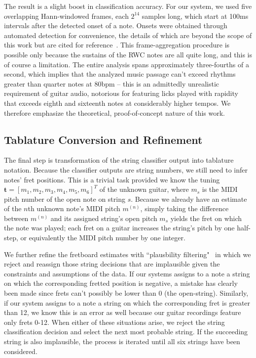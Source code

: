 \documentclass[12pt]{cmuthesis}
\begin{document}
The result is a slight boost in classification accuracy. For our system, we used five overlapping Hann-windowed frames, each $2^{14}$ samples long, which start at 100ms intervals after the detected onset of a note. Onsets were obtained through automated detection for convenience, the details of which are beyond the scope of this work but are cited for reference~\cite{bello2005,dixon2006}. This frame-aggregation procedure is possible only because the sustains of the RWC notes are all quite long, and this is of course a limitation. The entire analysis spans approximately three-fourths of a second, which implies that the analyzed music passage can't exceed rhythms greater than quarter notes at 80bpm -- this is an admittedly unrealistic requirement of guitar audio, notorious for featuring licks played with rapidity that exceeds eighth and sixteenth notes at considerably higher tempos. We therefore emphasize the theoretical, proof-of-concept nature of this work.

\subsection{Tablature Conversion and Refinement}
The final step is transformation of the string classifier output into tablature notation. Because the classifier outputs are string numbers, we still need to infer notes' fret positions. This is a trivial task provided we know the tuning $\mathbf{t} = [m_1, m_2, m_3, m_4, m_5, m_6]^T$ of the unknown guitar, where $m_s$ is the MIDI pitch number of the open note on string $s$. Because we already have an estimate of the $n$th unknown note's MIDI pitch $m^{(n)}$, simply taking the difference between $m^{(n)}$ and its assigned string's open pitch $m_s$ yields the fret on which the note was played; each fret on a guitar increases the string's pitch by one half-step, or equivalently the MIDI pitch number by one integer.

We further refine the fretboard estimates with ``plausbility filtering"~\cite{abesser2012} in which we reject and reassign those string decisions that are implausible given the constraints and assumptions of the data. If our systems assigns to a note a string on which the corresponding fretted position is negative, a mistake has clearly been made since frets can't possibly be lower than 0 (the open-string). Similarly, if our system assigns to a note a string on which the corresponding fret is greater than 12, we know this is an error as well because our guitar recordings feature only frets 0-12. When either of these situations arise, we reject the string classification decision and select the next most probable string. If the succeeding string is also implausible, the process is iterated until all six strings have been considered.
\end{document}
